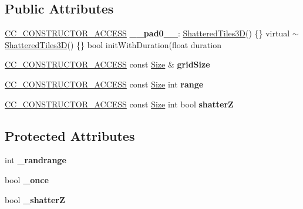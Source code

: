 \subsection*{Public Attributes}
\begin{DoxyCompactItemize}
\item 
\mbox{\label{classShatteredTiles3D_ae8df207d2332c67248e443d74b267415}} 
\hyperlink{_2cocos2d_2cocos_2base_2ccConfig_8h_a25ef1314f97c35a2ed3d029b0ead6da0}{C\+C\+\_\+\+C\+O\+N\+S\+T\+R\+U\+C\+T\+O\+R\+\_\+\+A\+C\+C\+E\+SS} {\bfseries \+\_\+\+\_\+pad0\+\_\+\+\_\+}\+: \hyperlink{classShatteredTiles3D}{Shattered\+Tiles3D}() \{\} virtual $\sim$\hyperlink{classShatteredTiles3D}{Shattered\+Tiles3D}() \{\} bool init\+With\+Duration(float duration
\item 
\mbox{\label{classShatteredTiles3D_a592195f68ed0001f76c2c0f246c3cbb1}} 
\hyperlink{_2cocos2d_2cocos_2base_2ccConfig_8h_a25ef1314f97c35a2ed3d029b0ead6da0}{C\+C\+\_\+\+C\+O\+N\+S\+T\+R\+U\+C\+T\+O\+R\+\_\+\+A\+C\+C\+E\+SS} const \hyperlink{classSize}{Size} \& {\bfseries grid\+Size}
\item 
\mbox{\label{classShatteredTiles3D_a17a27ea3fbf2dbec25fb08f55ee92526}} 
\hyperlink{_2cocos2d_2cocos_2base_2ccConfig_8h_a25ef1314f97c35a2ed3d029b0ead6da0}{C\+C\+\_\+\+C\+O\+N\+S\+T\+R\+U\+C\+T\+O\+R\+\_\+\+A\+C\+C\+E\+SS} const \hyperlink{classSize}{Size} int {\bfseries range}
\item 
\mbox{\label{classShatteredTiles3D_a91599c838e42b785db997b83c80a67c1}} 
\hyperlink{_2cocos2d_2cocos_2base_2ccConfig_8h_a25ef1314f97c35a2ed3d029b0ead6da0}{C\+C\+\_\+\+C\+O\+N\+S\+T\+R\+U\+C\+T\+O\+R\+\_\+\+A\+C\+C\+E\+SS} const \hyperlink{classSize}{Size} int bool {\bfseries shatterZ}
\end{DoxyCompactItemize}
\subsection*{Protected Attributes}
\begin{DoxyCompactItemize}
\item 
\mbox{\label{classShatteredTiles3D_ab4c1168e8ad0dc591fe70de50435511d}} 
int {\bfseries \+\_\+randrange}
\item 
\mbox{\label{classShatteredTiles3D_af73084ec34949f5bfc50fd0ca906da86}} 
bool {\bfseries \+\_\+once}
\item 
\mbox{\label{classShatteredTiles3D_a2e17c71b5fbc0d25e0a61098be0cbbcc}} 
bool {\bfseries \+\_\+shatterZ}
\end{DoxyCompactItemize}
